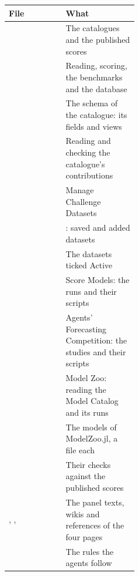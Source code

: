 \begin{center}\footnotesize
\renewcommand{\arraystretch}{1.2}
\begin{tabularx}{\linewidth}{@{}p{0.44\linewidth}L@{}}
\toprule
\textbf{File} & \textbf{What}\\
\midrule
{} & The catalogues and the published scores\\
 & Reading, scoring, the benchmarks and the database\\
 & The schema of the catalogue: its fields and views\\
 & Reading and checking the catalogue's contributions\\
 & Manage Challenge Datasets\\
 & : saved and added datasets\\
 & The datasets ticked Active\\
 & Score Models: the runs and their scripts\\
 & Agents' Forecasting Competition: the studies and their scripts\\
 & Model Zoo: reading the Model Catalog and its runs\\
 & The models of ModelZoo.jl, a file each\\
 & Their checks against the published scores\\
, ,  & The panel texts, wikis and references of the four pages\\
 & The rules the agents follow\\
\bottomrule
\end{tabularx}
\end{center}

